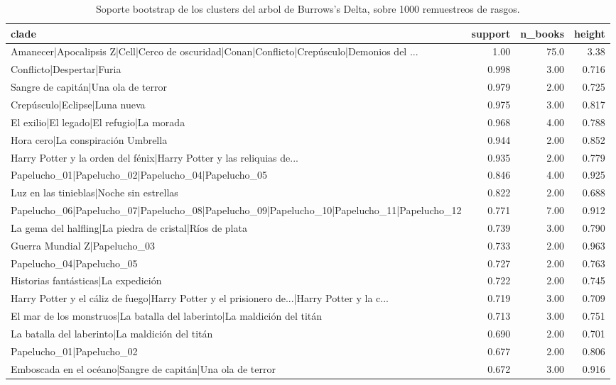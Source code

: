 \begin{table}[htbp]
\centering
\small
\caption{Soporte bootstrap de los clusters del arbol de Burrows's Delta, sobre 1000 remuestreos de rasgos.}
\label{tab:cluster-support-es}
\begin{tabular}{lrrr}
\toprule
\textbf{clade} & \textbf{support} & \textbf{n\_books} & \textbf{height} \\
\midrule
Amanecer|Apocalipsis Z|Cell|Cerco de oscuridad|Conan|Conflicto|Crepúsculo|Demonios del ... & 1.00 & 75.0 & 3.38 \\
Conflicto|Despertar|Furia & 0.998 & 3.00 & 0.716 \\
Sangre de capitán|Una ola de terror & 0.979 & 2.00 & 0.725 \\
Crepúsculo|Eclipse|Luna nueva & 0.975 & 3.00 & 0.817 \\
El exilio|El legado|El refugio|La morada & 0.968 & 4.00 & 0.788 \\
Hora cero|La conspiración Umbrella & 0.944 & 2.00 & 0.852 \\
Harry Potter y la orden del fénix|Harry Potter y las reliquias de... & 0.935 & 2.00 & 0.779 \\
Papelucho\_01|Papelucho\_02|Papelucho\_04|Papelucho\_05 & 0.846 & 4.00 & 0.925 \\
Luz en las tinieblas|Noche sin estrellas & 0.822 & 2.00 & 0.688 \\
Papelucho\_06|Papelucho\_07|Papelucho\_08|Papelucho\_09|Papelucho\_10|Papelucho\_11|Papelucho\_12 & 0.771 & 7.00 & 0.912 \\
La gema del halfling|La piedra de cristal|Ríos de plata & 0.739 & 3.00 & 0.790 \\
Guerra Mundial Z|Papelucho\_03 & 0.733 & 2.00 & 0.963 \\
Papelucho\_04|Papelucho\_05 & 0.727 & 2.00 & 0.763 \\
Historias fantásticas|La expedición & 0.722 & 2.00 & 0.745 \\
Harry Potter y el cáliz de fuego|Harry Potter y el prisionero de...|Harry Potter y la c... & 0.719 & 3.00 & 0.709 \\
El mar de los monstruos|La batalla del laberinto|La maldición del titán & 0.713 & 3.00 & 0.751 \\
La batalla del laberinto|La maldición del titán & 0.690 & 2.00 & 0.701 \\
Papelucho\_01|Papelucho\_02 & 0.677 & 2.00 & 0.806 \\
Emboscada en el océano|Sangre de capitán|Una ola de terror & 0.672 & 3.00 & 0.916 \\

\end{tabular}
\end{table}
